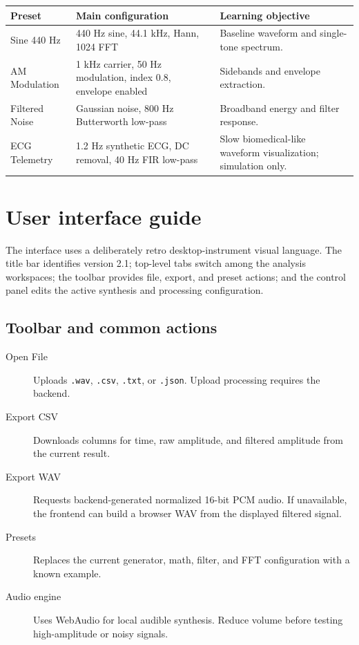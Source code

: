 \documentclass[10pt,a4paper]{article}
\newcommand{\code}[1]{\nolinkurl{#1}}
\begin{document}
\begin{tabularx}{\textwidth}{L{2.9cm}L{3.4cm}Y}
\toprule
Preset & Main configuration & Learning objective\\
\midrule
Sine 440 Hz & 440 Hz sine, 44.1 kHz, Hann, 1024 FFT & Baseline waveform and single-tone spectrum.\\
AM Modulation & 1 kHz carrier, 50 Hz modulation, index 0.8, envelope enabled & Sidebands and envelope extraction.\\
Filtered Noise & Gaussian noise, 800 Hz Butterworth low-pass & Broadband energy and filter response.\\
ECG Telemetry & 1.2 Hz synthetic ECG, DC removal, 40 Hz FIR low-pass & Slow biomedical-like waveform visualization; simulation only.\\
\bottomrule
\end{tabularx}

\section{User interface guide}

The interface uses a deliberately retro desktop-instrument visual language. The title bar identifies version 2.1; top-level tabs switch among the analysis workspaces; the toolbar provides file, export, and preset actions; and the control panel edits the active synthesis and processing configuration.

\subsection{Toolbar and common actions}

\begin{description}
  \item[Open File] Uploads \code{.wav}, \code{.csv}, \code{.txt}, or \code{.json}. Upload processing requires the backend.
  \item[Export CSV] Downloads columns for time, raw amplitude, and filtered amplitude from the current result.
  \item[Export WAV] Requests backend-generated normalized 16-bit PCM audio. If unavailable, the frontend can build a browser WAV from the displayed filtered signal.
  \item[Presets] Replaces the current generator, math, filter, and FFT configuration with a known example.
  \item[Audio engine] Uses WebAudio for local audible synthesis. Reduce volume before testing high-amplitude or noisy signals.
\end{description}
\end{document}
